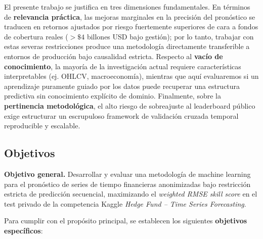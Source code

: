 \documentclass{article}
\begin{document}
El presente trabajo se justifica en tres dimensiones fundamentales. En términos de \textbf{relevancia práctica}, las mejoras marginales en la precisión del pronóstico se traducen en retornos ajustados por riesgo fuertemente superiores de cara a fondos de cobertura reales ($>\$4$ billones USD bajo gestión); por lo tanto, trabajar con estas severas restricciones produce una metodología directamente transferible a entornos de producción bajo causalidad estricta. Respecto al \textbf{vacío de conocimiento}, la mayoría de la investigación actual requiere características interpretables (ej. OHLCV, macroeconomía), mientras que aquí evaluaremos si un aprendizaje puramente guiado por los datos puede recuperar una estructura predictiva sin conocimiento explícito de dominio. Finalmente, sobre la \textbf{pertinencia metodológica}, el alto riesgo de sobreajuste al leaderboard público exige estructurar un escrupuloso framework de validación cruzada temporal reproducible y escalable.

\subsection{Objetivos}

\textbf{Objetivo general.} Desarrollar y evaluar una metodología de machine learning para el pronóstico de series de tiempo financieras anonimizadas bajo restricción estricta de predicción secuencial, maximizando el \emph{weighted RMSE skill score} en el test privado de la competencia Kaggle \emph{Hedge Fund -- Time Series Forecasting}.

Para cumplir con el propósito principal, se establecen los siguientes \textbf{objetivos específicos}:
\end{document}
